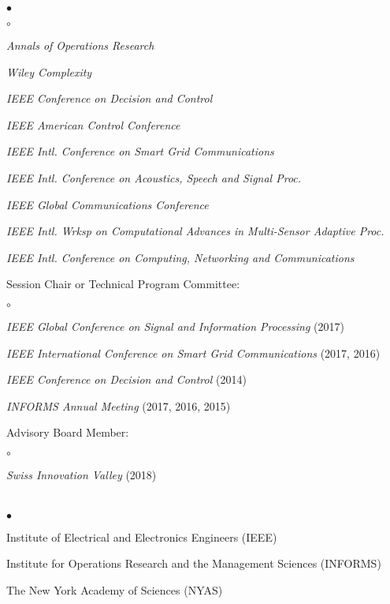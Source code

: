 \documentclass[margin,line]{res}
\newenvironment{list2}{
  \begin{list}{$\bullet$}{%
      \setlength{\itemsep}{0in}
      \setlength{\parsep}{0in} \setlength{\parskip}{0in}
      \setlength{\topsep}{0in} \setlength{\partopsep}{0in}
      \setlength{\leftmargin}{0.10in}}}{\end{list}}
\newenvironment{list3}{
  \begin{list}{$\circ$}{%
      \setlength{\itemsep}{0in}
      \setlength{\parsep}{0in} \setlength{\parskip}{0in}
      \setlength{\topsep}{0in} \setlength{\partopsep}{0in}
      \setlength{\leftmargin}{0.28in}}}{\end{list}}
\begin{document}
\begin{resume}
\begin{list2}
\begin{list3}
\item \emph{Annals of Operations Research} 
\item \emph{Wiley Complexity}
\item \emph{IEEE Conference on Decision and Control}
\item \emph{IEEE American Control Conference}
\item \emph{IEEE Intl. Conference on Smart Grid Communications}
\item \emph{IEEE Intl.  Conference on Acoustics, Speech and Signal Proc.}
\item \emph{IEEE Global Communications Conference}
\item \emph{IEEE Intl.  Wrksp on Computational Advances in Multi-Sensor Adaptive Proc.}
\item \emph{IEEE Intl.  Conference on Computing, Networking and Communications} 
\end{list3}
\vspace{4mm}
\item Session Chair or Technical Program Committee:
\begin{list3}
\item \emph{IEEE Global Conference on Signal and Information Processing} (2017)
\item \emph{IEEE International Conference on Smart Grid Communications} (2017, 2016)
\item \emph{IEEE Conference on Decision and Control}  (2014)
\item \emph{INFORMS Annual Meeting} (2017, 2016, 2015)
\end{list3}
\vspace{4mm}
\item Advisory Board Member:
\begin{list3}
\item \emph{Swiss Innovation Valley} (2018)
\end{list3}

\end{list2}
%


\vspace{0.4cm}

\section{}

\begin{list2}
\item Institute of Electrical and Electronics Engineers (IEEE)
\item Institute for Operations Research and the Management Sciences (INFORMS)
\item The New York Academy of Sciences (NYAS)
\end{list2}


\end{resume}
\end{document}
